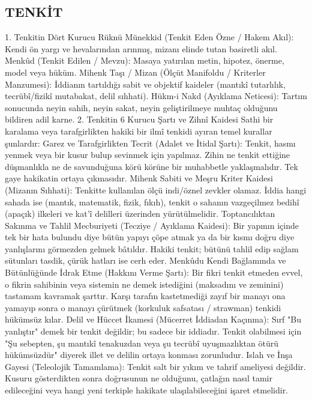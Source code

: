 \documentclass[11pt,a4paper]{article}
\begin{document}
\subsection{TENKİT}



1. Tenkitin Dört Kurucu Rüknü
 Münekkid (Tenkit Eden Özne / Hakem Akıl): Kendi ön yargı ve hevalarından arınmış, mizanı elinde tutan basiretli akıl.
 Menkûd (Tenkit Edilen / Mevzu): Masaya yatırılan metin, hipotez, önerme, model veya hüküm.
 Mihenk Taşı / Mizan (Ölçüt Manifoldu / Kriterler Manzumesi): İddianın tartıldığı sabit ve objektif kaideler (mantıkî tutarlılık, tecrübî/fizikî mutabakat, delil sıhhati).
 Hükm-i Nakd (Ayıklama Neticesi): Tartım sonucunda neyin sahih, neyin sakat, neyin geliştirilmeye muhtaç olduğunu bildiren adil karne.
2. Tenkitin 6 Kurucu Şartı ve Zihnî Kaidesi
Sathi bir karalama veya tarafgirlikten hakiki bir ilmî tenkidi ayıran temel kurallar şunlardır:
 Garez ve Tarafgirlikten Tecrit (Adalet ve İtidal Şartı):
Tenkit, hasmı yenmek veya bir kusur bulup sevinmek için yapılmaz. Zihin ne tenkit ettiğine düşmanlıkla ne de savunduğuna körü körüne bir muhabbetle yaklaşmalıdır. Tek gaye hakikatin ortaya çıkmasıdır.
 Mihenk Sabiti ve Meşru Kriter Kaidesi (Mizanın Sıhhati):
Tenkitte kullanılan ölçü indi/öznel zevkler olamaz. İddia hangi sahada ise (mantık, matematik, fizik, fıkıh), tenkit o sahanın vazgeçilmez bedihî (apaçık) ilkeleri ve kat'î delilleri üzerinden yürütülmelidir.
 Toptancılıktan Sakınma ve Tahlil Mecburiyeti (Tecziye / Ayıklama Kaidesi):
Bir yapının içinde tek bir hata bulundu diye bütün yapıyı çöpe atmak ya da bir kısmı doğru diye yanlışlarını görmezden gelmek bâtıldır. Hakiki tenkit; bütünü tahlil edip sağlam sütunları tasdik, çürük hatları ise cerh eder.
 Menkûdu Kendi Bağlamında ve Bütünlüğünde İdrak Etme (Hakkını Verme Şartı):
Bir fikri tenkit etmeden evvel, o fikrin sahibinin veya sistemin ne demek istediğini (maksadını ve zeminini) tastamam kavramak şarttır. Karşı tarafın kastetmediği zayıf bir manayı ona yamayıp sonra o manayı çürütmek (korkuluk safsatası / strawman) tenkidi hükümsüz kılar.
 Delil ve Hüccet İkamesi (Mücerret İddiadan Kaçınma):
Sırf "Bu yanlıştır" demek bir tenkit değildir; bu sadece bir iddiadır. Tenkit olabilmesi için "Şu sebepten, şu mantıkî tenakuzdan veya şu tecrübî uyuşmazlıktan ötürü hükümsüzdür" diyerek illet ve delilin ortaya konması zorunludur.
 Islah ve İnşa Gayesi (Teleolojik Tamamlama):
Tenkit salt bir yıkım ve tahrif ameliyesi değildir. Kusuru gösterdikten sonra doğrusunun ne olduğunu, çatlağın nasıl tamir edileceğini veya hangi yeni terkiple hakikate ulaşılabileceğini işaret etmelidir.
\end{document}
